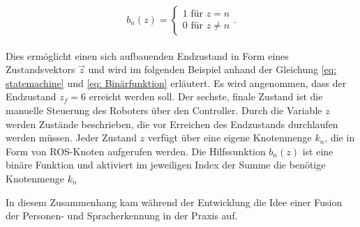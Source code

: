 		\begin{equation}
			b_n(z)=\left\{\begin{array}{ll} 1 \text{ für } z=n \\
				0 \text{ für }z\neq n\end{array}\right. .
			\label{eq: Binärfunktion}
		\end{equation}\\
	
		Dies ermöglicht einen sich aufbauenden Endzustand in Form eines Zustandsvektors $\vec{z}$ und wird im folgenden Beispiel anhand der Gleichung \ref{eq: statemachine} und \ref{eq: Binärfunktion} erläutert. Es wird angenommen, dass der Endzustand $z_f=6$ erreicht werden soll. Der sechste, finale Zustand ist die manuelle Steuerung des Roboters über den Controller. Durch die Variable $z$ werden Zustände beschrieben, die vor Erreichen des Endzustands durchlaufen werden müssen. Jeder Zustand $z$ verfügt über eine eigene Knotenmenge $k_n$, die in Form von ROS-Knoten aufgerufen werden. Die Hilfssunktion $b_n(z)$ ist eine binäre Funktion und aktiviert im jeweiligen Index der Summe die benötige Knotenmenge $k_n$
	
		
		
		
		In diesem Zusammenhang kam während der Entwicklung die Idee einer Fusion der Personen- und Spracherkennung in der Praxis auf.  
		
	
		
		
				   		

